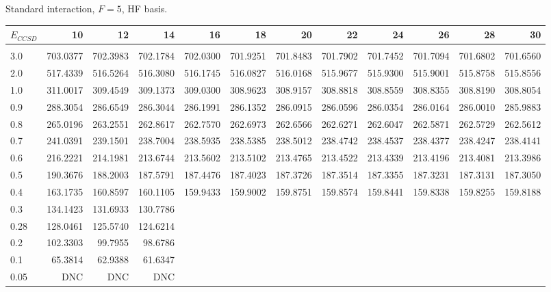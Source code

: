 \begin{landscape}
\begin{table}
\begin{center}
Standard interaction, $F=5$, HF basis.\\
\begin{tabular}{l|rrrrrrrrrrr}
\hline 
$E_{CCSD}$ & 10 & 12 & 14 & 16 & 18 & 20 & 22 & 24 & 26 & 28 & 30 \\
\hline \hline\\
3.0 & 703.0377 & 702.3983 & 702.1784 & 702.0300 & 701.9251 & 701.8483 & 701.7902 & 701.7452 & 701.7094 & 701.6802 & 701.6560 \\ 
2.0 & 517.4339 & 516.5264 & 516.3080 & 516.1745 & 516.0827 & 516.0168 & 515.9677 & 515.9300 & 515.9001 & 515.8758 & 515.8556 \\ 
1.0 & 311.0017 & 309.4549 & 309.1373 & 309.0300 & 308.9623 & 308.9157 & 308.8818 & 308.8559 & 308.8355 & 308.8190 & 308.8054 \\ 
0.9 & 288.3054 & 286.6549 & 286.3044 & 286.1991 & 286.1352 & 286.0915 & 286.0596 & 286.0354 & 286.0164 & 286.0010 & 285.9883 \\ 
0.8 & 265.0196 & 263.2551 & 262.8617 & 262.7570 & 262.6973 & 262.6566 & 262.6271 & 262.6047 & 262.5871 & 262.5729 & 262.5612 \\ 
0.7 & 241.0391 & 239.1501 & 238.7004 & 238.5935 & 238.5385 & 238.5012 & 238.4742 & 238.4537 & 238.4377 & 238.4247 & 238.4141 \\ 
0.6 & 216.2221 & 214.1981 & 213.6744 & 213.5602 & 213.5102 & 213.4765 & 213.4522 & 213.4339 & 213.4196 & 213.4081 & 213.3986 \\ 
0.5 & 190.3676 & 188.2003 & 187.5791 & 187.4476 & 187.4023 & 187.3726 & 187.3514 & 187.3355 & 187.3231 & 187.3131 & 187.3050 \\ 
0.4 & 163.1735 & 160.8597 & 160.1105 & 159.9433 & 159.9002 & 159.8751 & 159.8574 & 159.8441 & 159.8338 & 159.8255 & 159.8188 \\ 
0.3 & 134.1423 & 131.6933 & 130.7786 &  \\ 
0.28 & 128.0461 & 125.5740 & 124.6214  \\ 
0.2 & 102.3303 & 99.7955 & 98.6786  \\ 
0.1 & 65.3814 & 62.9388 & 61.6347  \\ 
0.05 & DNC & DNC & DNC  \\ 
\hline \hline
\end{tabular}
\end{center}
\end{table}
\end{landscape}


